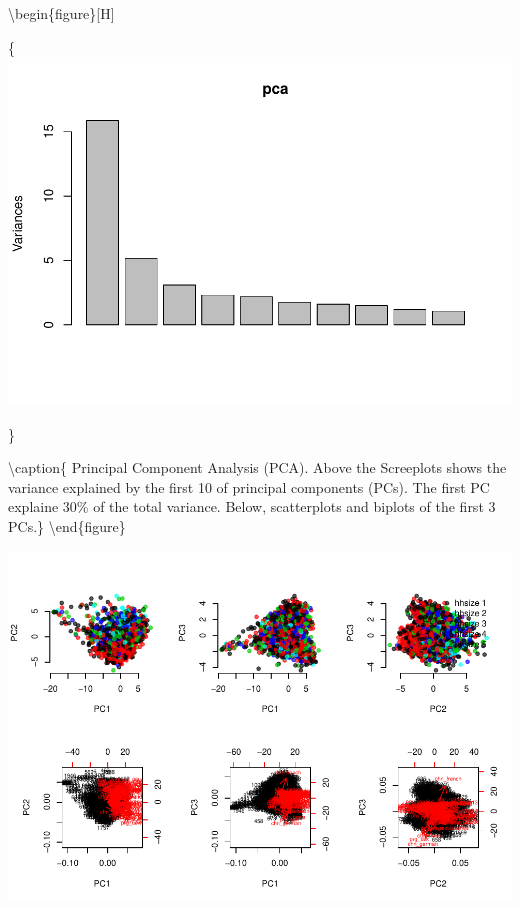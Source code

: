 \documentclass[]{article}
\begin{document}
\textbackslash{}begin\{figure\}{[}H{]}

\{\centering \includegraphics[width=0.5\linewidth]{Diploma_files/figure-latex/fig5-1}

\}

\textbackslash{}caption\{\label{fig:fig4} Principal Component Analysis
(PCA). Above the Screeplots shows the variance explained by the first 10
of principal components (PCs). The first PC explaine 30\% of the total
variance. Below, scatterplots and biplots of the first 3
PCs.\}\label{fig:fig5} \textbackslash{}end\{figure\}

\includegraphics{Diploma_files/figure-latex/unnamed-chunk-15-1.pdf}
\end{document}

